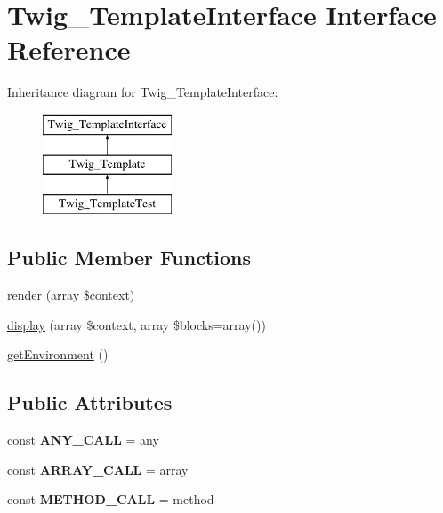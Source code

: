 \hypertarget{interfaceTwig__TemplateInterface}{}\section{Twig\+\_\+\+Template\+Interface Interface Reference}
\label{interfaceTwig__TemplateInterface}
Inheritance diagram for Twig\+\_\+\+Template\+Interface\+:\begin{figure}[H]
\begin{center}
\leavevmode
\includegraphics[height=3.000000cm]{interfaceTwig__TemplateInterface}
\end{center}
\end{figure}
\subsection*{Public Member Functions}
\begin{DoxyCompactItemize}
\item 
\hyperlink{interfaceTwig__TemplateInterface_a9060645a8d50bfddec2ba92558854142}{render} (array \$context)
\item 
\hyperlink{interfaceTwig__TemplateInterface_a445d9f983068d584533df033ddad2680}{display} (array \$context, array \$blocks=array())
\item 
\hyperlink{interfaceTwig__TemplateInterface_a2a1d37d2a36f6b5a7d2a6e6633a232af}{get\+Environment} ()
\end{DoxyCompactItemize}
\subsection*{Public Attributes}
\begin{DoxyCompactItemize}
\item 
const {\bfseries A\+N\+Y\+\_\+\+C\+A\+LL} = \textquotesingle{}any\textquotesingle{}\hypertarget{interfaceTwig__TemplateInterface_af933ba7e595af4a420c205dacfab531b}{}\label{interfaceTwig__TemplateInterface_af933ba7e595af4a420c205dacfab531b}

\item 
const {\bfseries A\+R\+R\+A\+Y\+\_\+\+C\+A\+LL} = \textquotesingle{}array\textquotesingle{}\hypertarget{interfaceTwig__TemplateInterface_ab0d0165ff18117c7bc373b56c848dab4}{}\label{interfaceTwig__TemplateInterface_ab0d0165ff18117c7bc373b56c848dab4}

\item 
const {\bfseries M\+E\+T\+H\+O\+D\+\_\+\+C\+A\+LL} = \textquotesingle{}method\textquotesingle{}\hypertarget{interfaceTwig__TemplateInterface_a57cb02030768dfa0e61514b64bfbb152}{}\label{interfaceTwig__TemplateInterface_a57cb02030768dfa0e61514b64bfbb152}

\end{DoxyCompactItemize}


